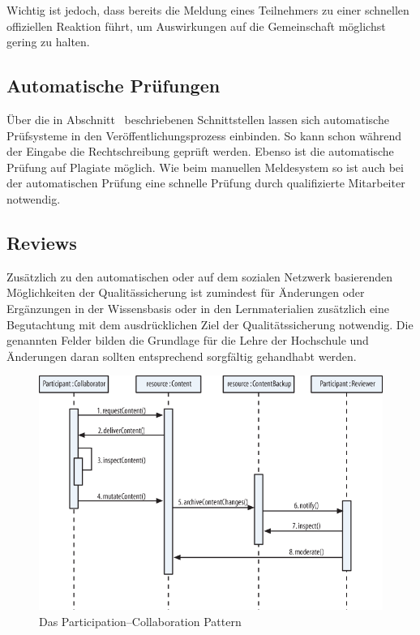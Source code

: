 Wichtig ist jedoch, dass bereits die Meldung eines Teilnehmers zu einer schnellen offiziellen Reaktion führt, um Auswirkungen auf die Gemeinschaft möglichst gering zu halten.

\subsection{Automatische Prüfungen} %
\label{sub:prufung_auf_plagiate}
Über die in Abschnitt~ beschriebenen Schnittstellen lassen sich automatische Prüfsysteme in den Veröffentlichungsprozess einbinden. So kann schon während der Eingabe die Rechtschreibung geprüft werden. Ebenso ist die automatische Prüfung auf Plagiate möglich. Wie beim manuellen Meldesystem so ist auch bei der automatischen Prüfung eine schnelle Prüfung durch qualifizierte Mitarbeiter notwendig.

\subsection{Reviews} %
Zusätzlich zu den automatischen oder auf dem sozialen Netzwerk basierenden Möglichkeiten der Qualitässicherung ist zumindest für Änderungen oder Ergänzungen in der Wissensbasis oder in den Lernmaterialien zusätzlich eine Begutachtung mit dem ausdrücklichen Ziel der Qualitätssicherung notwendig. Die genannten Felder bilden die Grundlage für die Lehre der Hochschule und Änderungen daran sollten entsprechend sorgfältig gehandhabt werden.

\label{sub:reviews}
\begin{figure}[H]
\begin{center}
\includegraphics[width=\textwidth]{partcollpat.png}
\caption[Das Participation–Collaboration Pattern]{Das Participation–Collaboration Pattern\footnotemark}
\label{fig:partcolpat}
\end{center}
\end{figure}

